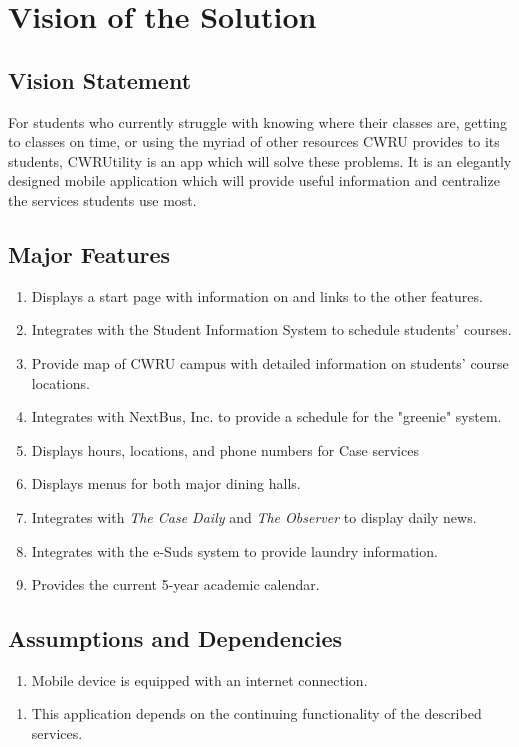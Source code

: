 \documentclass[pdftex,12pt,letter]{article}
\begin{document}
\section{Vision of the Solution}
\subsection{Vision Statement}
For students who currently struggle with knowing where their classes are, getting to classes on time, or using the myriad of other resources CWRU provides to its students, CWRUtility is an app which will solve these problems. It is an elegantly designed mobile application which will provide useful information and centralize the services students use most.
\subsection{Major Features}
\begin{enumerate}[FE-1:]
\item Displays a start page with information on and links to the other features.
\item Integrates with the Student Information System to schedule students' courses.
\item Provide map of CWRU campus with detailed information on students' course locations.
\item Integrates with NextBus, Inc. to provide a schedule for the "greenie" system.
\item Displays hours, locations, and phone numbers for Case services
\item Displays menus for both major dining halls.
\item Integrates with \emph{The Case Daily} and \emph{The Observer} to display daily news.
\item Integrates with the e-Suds system to provide laundry information.
\item Provides the current 5-year academic calendar.
\end{enumerate} 
\subsection{Assumptions and Dependencies}
\begin{enumerate}[{A}S-1:]
\item Mobile device is equipped with an internet connection.
\end{enumerate}
\begin{enumerate}[DE-1:]
\item This application depends on the continuing functionality of the described services.
\end{enumerate}
\end{document}
